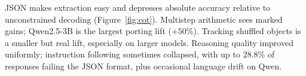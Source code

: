 JSON makes extraction easy and depresses absolute accuracy relative to unconstrained decoding (Figure~\ref{fig:cot}).
Multistep arithmetic sees marked gains; Qwen2.5-3B is the largest porting lift ($+50\%$).
Tracking shuffled objects is a smaller but real lift, especially on larger models.
Reasoning quality improved uniformly; instruction following sometimes collapsed, with up to $28.8\%$ of responses failing the JSON format, plus occasional language drift on Qwen.

